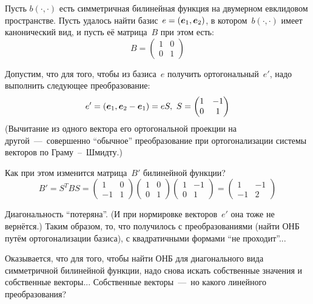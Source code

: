 \documentclass[a4paper,12pt]{article}
\theoremstyle{remark}
\begin{document}
  \begin{example}
    Пусть $b(\cdot, \cdot)$ есть симметричная билинейная функция на двумерном евклидовом пространстве.
    Пусть удалось найти базис~$e \hm= (\bds e_1, \bds e_2)$, в котором~$b(\cdot, \cdot)$ имеет канонический вид, и пусть её матрица~$B$ при этом есть:
    \[
      B = \begin{pmatrix}
        1 & 0\\
        0 & 1
      \end{pmatrix}
    \]
    
    Допустим, что для того, чтобы из базиса~$e$ получить ортогональный~$e'$, надо выполнить следующее преобразование:
    \[
      e' = (\boldsymbol e_1, \boldsymbol e_2 - \boldsymbol e_1) = e S,\ S = \begin{pmatrix}
        1 & -1\\
        0 & 1
      \end{pmatrix}
    \]
    (Вычитание из одного вектора его ортогональной проекции на другой~---~совершенно ``обычное'' преобразование при ортогонализации системы векторов по Граму~--~Шмидту.)
    
    Как при этом изменится матрица~$B'$ билинейной функции?
    \[
      B' = S^T B S = \begin{pmatrix}
        1 & 0\\
        -1 & 1
      \end{pmatrix}
      \begin{pmatrix}
        1 & 0\\
        0 & 1
      \end{pmatrix}
      \begin{pmatrix}
        1 & -1\\
        0 & 1
      \end{pmatrix} = \begin{pmatrix}
        1 & -1\\
        -1 & 2
      \end{pmatrix}
    \]
    
    Диагональность ``потеряна''.
    (И при нормировке векторов~$e'$ она тоже не вернётся.)
    Таким образом, то, что получилось с преобразованиями (найти ОНБ путём ортогонализации базиса), с квадратичными формами ``не проходит''...
  \end{example}
  
  Оказывается, что для того, чтобы найти ОНБ для диагонального вида симметричной билинейной функции, надо снова искать собственные значения и собственные векторы...
  Собственные векторы~---~но какого линейного преобразования?
  
\end{document}
